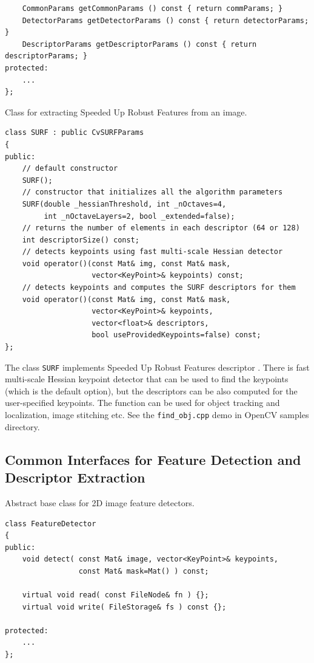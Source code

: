\begin{lstlisting}
    CommonParams getCommonParams () const { return commParams; }
    DetectorParams getDetectorParams () const { return detectorParams; }
    DescriptorParams getDescriptorParams () const { return descriptorParams; }
protected:
    ...
};
\end{lstlisting}

Class for extracting Speeded Up Robust Features from an image.

\begin{lstlisting}
class SURF : public CvSURFParams
{
public:
    // default constructor
    SURF();
    // constructor that initializes all the algorithm parameters
    SURF(double _hessianThreshold, int _nOctaves=4,
         int _nOctaveLayers=2, bool _extended=false);
    // returns the number of elements in each descriptor (64 or 128)
    int descriptorSize() const;
    // detects keypoints using fast multi-scale Hessian detector
    void operator()(const Mat& img, const Mat& mask,
                    vector<KeyPoint>& keypoints) const;
    // detects keypoints and computes the SURF descriptors for them
    void operator()(const Mat& img, const Mat& mask,
                    vector<KeyPoint>& keypoints,
                    vector<float>& descriptors,
                    bool useProvidedKeypoints=false) const;
};
\end{lstlisting}

The class \texttt{SURF} implements Speeded Up Robust Features descriptor \cite{Bay06}.
There is fast multi-scale Hessian keypoint detector that can be used to find the keypoints
(which is the default option), but the descriptors can be also computed for the user-specified keypoints.
The function can be used for object tracking and localization, image stitching etc. See the
\texttt{find\_obj.cpp} demo in OpenCV samples directory.

\subsection{Common Interfaces for Feature Detection and Descriptor Extraction}

Abstract base class for 2D image feature detectors.

\begin{lstlisting}
class FeatureDetector
{
public:
    void detect( const Mat& image, vector<KeyPoint>& keypoints, 
                 const Mat& mask=Mat() ) const;
                 
    virtual void read( const FileNode& fn ) {};
    virtual void write( FileStorage& fs ) const {};

protected:
    ...
};
\end{lstlisting}

